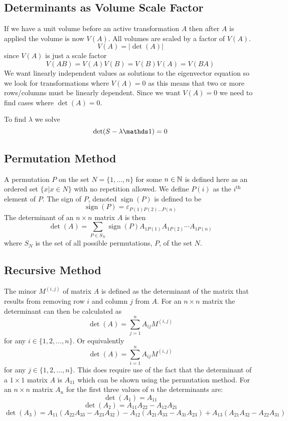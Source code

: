 \documentclass{article}
\newcommand{\sign}{\operatorname{sign}}
\begin{document}
    \subsection{Determinants as Volume Scale Factor}
    If we have a unit volume before an active transformation \(A\) then after \(A\) is applied the volume is now \(V(A)\). 
    All volumes are scaled by a factor of \(V(A)\).
    \[V(A) = |\det(A)|\]
    since \(V(A)\) is just a scale factor
    \[V(AB) = V(A)V(B)= V(B)V(A) = V(BA)\]
    We want linearly independent values as solutions to the eigenvector equation so we look for transformations where \(V(A) = 0\) as this means that two or more rows/columns must be linearly dependent.
    Since we want \(V(A) = 0\) we need to find cases where \(\det(A) = 0\).
    
    To find \(\lambda\) we solve
    \[\det(S - \lambda\ident) = 0\]
    
    \subsection{Permutation Method}
    A permutation \(P\) on the set \(N = \{1,\dotsc,n\}\) for some \(n\in\mathbb{N}\) is defined here as an ordered set \(\{x | x \in N\}\) with no repetition allowed.
    We define \(P(i)\) as the \(i^\text{th}\) element of \(P\).
    The sign of \(P\), denoted \(\sign(P)\) is defined to be
    \[\sign(P) = \varepsilon_{P(1)P(2)\dotso P(n)}\]
    The determinant of an \(n\times n\) matrix \(A\) is then
    \[\det(A) = \sum_{P\in S_N}\sign(P)A_{1P(1)}A_{1P(2)}\dotsb A_{1P(n)}\]
    where \(S_N\) is the set of all possible permutations, \(P\), of the set \(N\).
    
    \subsection{Recursive Method}
    The minor \(M^{(i,j)}\) of matrix \(A\) is defined as the determinant of the matrix that results from removing row \(i\) and column \(j\) from \(A\).
    For an \(n\times n\) matrix the determinant can then be calculated as
    \[\det(A) = \sum_{j = 1}^{n} A_{ij}M^{(i, j)}\]
    for any \(i\in\{1, 2,\dotsc, n\}\). Or equivalently
    \[\det(A) = \sum_{i=1}^{n}A_{ij}M^{(i, j)}\]
    for any \(j\in\{1, 2,\dotsc, n\}\).
    This does require use of the fact that the determinant of a \(1\times 1\) matrix \(A\) is \(A_{11}\) which can be shown using the permutation method.
    For an \(n\times n\) matrix \(A_n\) for the first three values of \(n\) the determinants are:
    \[\det(A_1) = A_{11}\]
    \[\det(A_2) = A_{11}A_{22} - A_{12}A_{21}\]
    \[\det(A_3) = A_{11}(A_{22}A_{33} - A_{23}A_{32}) - A_{12}(A_{21}A_{33} - A_{31}A_{23}) + A_{13}(A_{21}A_{32} - A_{22}A_{31})\]
    
\end{document}
